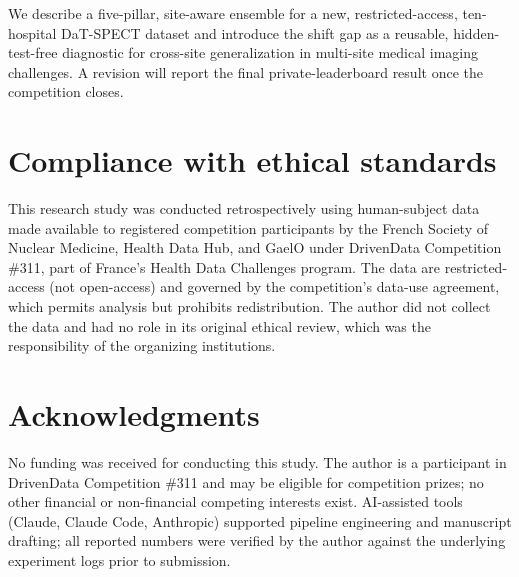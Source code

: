 \documentclass{article}
\begin{document}
We describe a five-pillar, site-aware ensemble for a new, restricted-access, ten-hospital DaT-SPECT dataset and introduce the shift gap as a reusable, hidden-test-free diagnostic for cross-site generalization in multi-site medical imaging challenges. A revision will report the final private-leaderboard result once the competition closes.

\section{Compliance with ethical standards}
\label{sec:ethics}

This research study was conducted retrospectively using human-subject data made available to registered competition participants by the French Society of Nuclear Medicine, Health Data Hub, and GaelO under DrivenData Competition \#311, part of France's Health Data Challenges program. The data are restricted-access (not open-access) and governed by the competition's data-use agreement, which permits analysis but prohibits redistribution. The author did not collect the data and had no role in its original ethical review, which was the responsibility of the organizing institutions.

\section{Acknowledgments}
\label{sec:ack}

No funding was received for conducting this study. The author is a participant in DrivenData Competition \#311 and may be eligible for competition prizes; no other financial or non-financial competing interests exist. AI-assisted tools (Claude, Claude Code, Anthropic) supported pipeline engineering and manuscript drafting; all reported numbers were verified by the author against the underlying experiment logs prior to submission.
\end{document}
